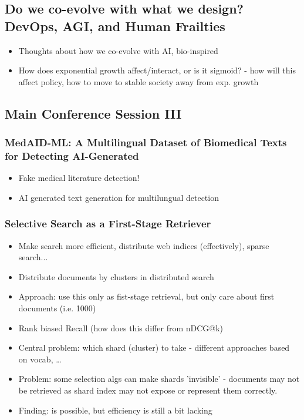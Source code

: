 \documentclass[a4paper]{article}
\begin{document}
\subsection{Do we co-evolve with what we design? DevOps, AGI, and Human Frailties}
\begin{itemize}
    \item Thoughts about how we co-evolve with AI, bio-inspired
    \item How does exponential growth affect/interact, or is it sigmoid? - how will this affect policy, how to move to stable society away from exp. growth
\end{itemize}
\subsection{Main Conference Session III}
\subsubsection{MedAID-ML: A Multilingual Dataset of Biomedical Texts for Detecting AI-Generated}
\begin{itemize}
    \item Fake medical literature detection!
    \item AI generated text generation for multilungual detection
\end{itemize}
\subsubsection{Selective Search as a First-Stage Retriever}
\begin{itemize}
    \item Make search more efficient, distribute web indices (effectively), sparse search...
    \item Distribute documents by clusters in distributed search
    \item Approach: use this only as fist-stage retrieval, but only care about first documents (i.e. 1000)
    \item Rank biased Recall (how does this differ from nDCG@k)
    \item Central problem: which shard (cluster) to take - different approaches based on vocab, \dots
    \item Problem: some selection algs can make shards 'invisible' - documents may not be retrieved as shard index may not expose or represent them correctly.
    \item Finding: is possible, but efficiency is still a bit lacking
\end{itemize}
\end{document}
